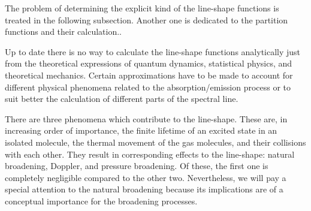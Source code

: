 The problem of determining the explicit kind of the line-shape
functions is treated in the following subsection. Another one is
dedicated to the partition functions and their calculation..


 Up to date there is no way to calculate
the line-shape functions analytically just from the theoretical
expressions of quantum dynamics, statistical physics, and theoretical
mechanics. Certain approximations have to be made to account for
different physical phenomena related to the absorption/emission
process or to suit better the calculation of different parts of the
spectral line.

There are three phenomena which contribute to the line-shape. These
are, in increasing order of importance, the finite lifetime of an
excited state in an isolated molecule, the thermal movement of the gas
molecules, and their collisions with each other. They result in
corresponding effects to the line-shape: natural broadening, Doppler,
and pressure broadening. Of these, the first one is completely
negligible compared to the other two. Nevertheless, we will pay a
special attention to the natural broadening because its implications
are of a conceptual importance for the broadening processes.

